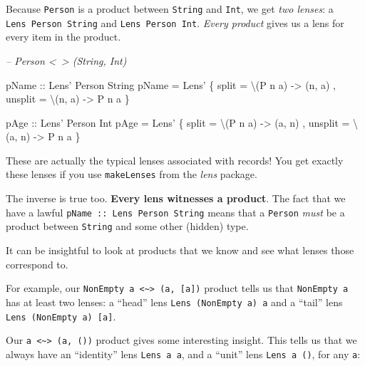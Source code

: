 \documentclass[]{article}
\newenvironment{Shaded}{}{}
\newcommand{\CommentTok}[1]{\textcolor[rgb]{0.38,0.63,0.69}{\textit{#1}}}
\newcommand{\DataTypeTok}[1]{\textcolor[rgb]{0.56,0.13,0.00}{#1}}
\newcommand{\FunctionTok}[1]{\textcolor[rgb]{0.02,0.16,0.49}{#1}}
\newcommand{\NormalTok}[1]{#1}
\newcommand{\OtherTok}[1]{\textcolor[rgb]{0.00,0.44,0.13}{#1}}
\begin{document}
Because \texttt{Person} is a product between \texttt{String} and \texttt{Int},
we get \emph{two lenses}: a \texttt{Lens\textquotesingle{}\ Person\ String} and
\texttt{Lens\textquotesingle{}\ Person\ Int}. \emph{Every product} gives us a
lens for every item in the product.

\begin{Shaded}
\begin{Highlighting}[]
\CommentTok{-- Person <~> (String, Int)}

\OtherTok{pName ::} \DataTypeTok{Lens'} \DataTypeTok{Person} \DataTypeTok{String}
\NormalTok{pName }\FunctionTok{=} \DataTypeTok{Lens'}\NormalTok{ \{ split   }\FunctionTok{=}\NormalTok{ \textbackslash{}(}\DataTypeTok{P}\NormalTok{ n a) }\OtherTok{->}\NormalTok{ (n, a)}
\NormalTok{              , unsplit }\FunctionTok{=}\NormalTok{ \textbackslash{}(n, a)  }\OtherTok{->} \DataTypeTok{P}\NormalTok{ n a}
\NormalTok{              \}}

\OtherTok{pAge ::} \DataTypeTok{Lens'} \DataTypeTok{Person} \DataTypeTok{Int}
\NormalTok{pAge }\FunctionTok{=} \DataTypeTok{Lens'}\NormalTok{ \{ split   }\FunctionTok{=}\NormalTok{ \textbackslash{}(}\DataTypeTok{P}\NormalTok{ n a) }\OtherTok{->}\NormalTok{ (a, n)}
\NormalTok{             , unsplit }\FunctionTok{=}\NormalTok{ \textbackslash{}(a, n)  }\OtherTok{->} \DataTypeTok{P}\NormalTok{ n a}
\NormalTok{             \}}
\end{Highlighting}
\end{Shaded}

These are actually the typical lenses associated with records! You get exactly
these lenses if you use \texttt{makeLenses} from the \emph{lens} package.

The inverse is true too. \textbf{Every lens witnesses a product}. The fact that
we have a lawful \texttt{pName\ ::\ Lens\textquotesingle{}\ Person\ String}
means that a \texttt{Person} \emph{must} be a product between \texttt{String}
and some other (hidden) type.

It can be insightful to look at products that we know and see what lenses those
correspond to.

For example, our
\texttt{NonEmpty\ a\ \textless{}\textasciitilde{}\textgreater{}\ (a,\ {[}a{]})}
product tells us that \texttt{NonEmpty\ a} has at least two lenses: a ``head''
lens \texttt{Lens\textquotesingle{}\ (NonEmpty\ a)\ a} and a ``tail'' lens
\texttt{Lens\textquotesingle{}\ (NonEmpty\ a)\ {[}a{]}}.

Our \texttt{a\ \textless{}\textasciitilde{}\textgreater{}\ (a,\ ())} product
gives some interesting insight. This tells us that we always have an
``identity'' lens \texttt{Lens\textquotesingle{}\ a\ a}, and a ``unit'' lens
\texttt{Lens\textquotesingle{}\ a\ ()}, for any \texttt{a}:
\end{document}
